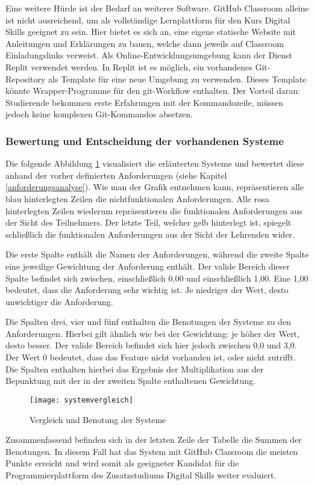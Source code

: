 Eine weitere Hürde ist der Bedarf an weiterer Software. GitHub Classroom alleine
ist nicht ausreichend, um als vollständige Lernplattform für den Kurs Digital
Skills geeignet zu sein. Hier bietet es sich an, eine eigene statische Website
mit Anleitungen und Erklärungen zu bauen, welche dann jeweils auf Classroom
Einladungslinks verweist. Als Online-Entwicklungsumgebung kann der Dienst Replit
verwendet werden. In Replit ist es möglich, ein vorhandenes Git-Repository als
Template für eine neue Umgebung zu verwenden. Dieses Template könnte
Wrapper-Programme für den git-Workflow enthalten. Der Vorteil daran:
Studierende bekommen erste Erfahrungen mit der Kommandozeile, müssen jedoch
keine komplexen Git-Kommandos absetzen.

\subsubsection{Bewertung und Entscheidung der vorhandenen Systeme}
Die folgende Abbildung \ref{fig:systemvergleich} visualisiert die erläuterten
Systeme und bewertet diese anhand der vorher definierten Anforderungen (siehe 
Kapitel \ref{anforderungsanalyse}). Wie man der Grafik entnehmen kann,
repräsentieren alle blau hinterlegten Zeilen die nichtfunktionalen
Anforderungen. Alle rosa hinterlegten Zeilen wiederum repräsentieren die
funktionalen Anforderungen aus der Sicht des Teilnehmers. Der letzte Teil,
welcher gelb hinterlegt ist, spiegelt schließlich die funktionalen Anforderungen
aus der Sicht der Lehrenden wider.

Die erste Spalte enthält die Namen der Anforderungen, während die zweite Spalte
eine jeweilige Gewichtung der Anforderung enthält. Der valide Bereich dieser
Spalte befindet sich zwischen, einschließlich 0,00 und einschließlich 1,00. Eine
1,00 bedeutet, dass die Anforderung sehr wichtig ist. Je niedriger der Wert,
desto unwichtiger die Anforderung.

Die Spalten drei, vier und fünf enthalten die Benotungen der Systeme zu den
Anforderungen. Hierbei gilt ähnlich wie bei der Gewichtung: je höher der Wert,
desto besser. Der valide Bereich befindet sich hier jedoch zwischen 0,0 und 3,0.
Der Wert 0 bedeutet, dass das Feature nicht vorhanden ist, oder nicht zutrifft.
Die Spalten enthalten hierbei das Ergebnis der Multiplikation aus der Bepunktung
mit der in der zweiten Spalte enthaltenen Gewichtung.

\begin{figure}[H]
    \centering
    \texttt{[image: systemvergleich]}
    \caption{Vergleich und Benotung der Systeme}
    \label{fig:systemvergleich}
\end{figure}

Zusammenfassend befinden sich in der letzten Zeile der Tabelle die Summen der Benotungen. In diesem Fall hat das System mit GitHub Classroom die meisten
Punkte erreicht und wird somit als geeigneter Kandidat für die
Programmierplattform des Zusatzstudiums Digital Skills weiter evaluiert.